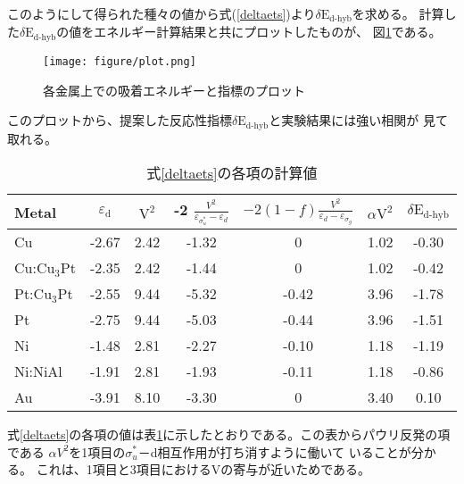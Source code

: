 \documentclass[12pt]{ltjsarticle}
\begin{document}
このようにして得られた種々の値から式(\ref{deltaets})より$\delta \text{E}_\text{d-hyb}$を求める。
計算した$\delta \text{E}_\text{d-hyb}$の値をエネルギー計算結果と共にプロットしたものが、
図\ref{fig:plot}である。
\begin{figure}[hbtp]
    \begin{center}
     \texttt{[image: figure/plot.png]}
    \end{center}
    \caption{各金属上での吸着エネルギーと指標のプロット}
    \label{fig:plot}
\end{figure}
このプロットから、提案した反応性指標$\delta \text{E}_\text{d-hyb}$と実験結果には強い相関が
見て取れる。
\begin{table}[htb]
  \begin{center}
    \caption{式\ref{deltaets}の各項の計算値}
    \begin{tabular}{l|cccccc} \hline
    \label{table}
      Metal & $\varepsilon_\text{d}$ & $\text{V}^\text{2}$ & -2 $\frac{ V^2 }{\varepsilon _{\sigma_u^*}- \varepsilon _d}$ & $-2(1-f)\frac{V^2}{\varepsilon _d - \varepsilon _{\sigma_g}} $ & $\alpha \text{V}^\text{2}$ & $\delta \text{E}_\text{d-hyb}$ \\ \hline
      Cu                        & -2.67 & 2.42 & -1.32 & 0     & 1.02 & -0.30 \\
      Cu:$\text{Cu}_\text{3}$Pt & -2.35 & 2.42 & -1.44 & 0     & 1.02 & -0.42 \\
      Pt:$\text{Cu}_\text{3}$Pt & -2.55 & 9.44 & -5.32 & -0.42 & 3.96 & -1.78 \\
      Pt                        & -2.75 & 9.44 & -5.03 & -0.44 & 3.96 & -1.51 \\
      Ni                        & -1.48 & 2.81 & -2.27 & -0.10 & 1.18 & -1.19 \\ 
      Ni:NiAl                   & -1.91 & 2.81 & -1.93 & -0.11 & 1.18 & -0.86 \\
      Au                        & -3.91 & 8.10 & -3.30 & 0     & 3.40 & 0.10  \\ \hline
    \end{tabular}
  \end{center}
\end{table}

式\ref{deltaets}の各項の値は表\ref{table}に示したとおりである。この表からパウリ反発の項である
$\alpha V^2$を1項目の$\sigma_u^*$－d相互作用が打ち消すように働いて
いることが分かる。
これは、1項目と3項目におけるVの寄与が近いためである。
\end{document}
